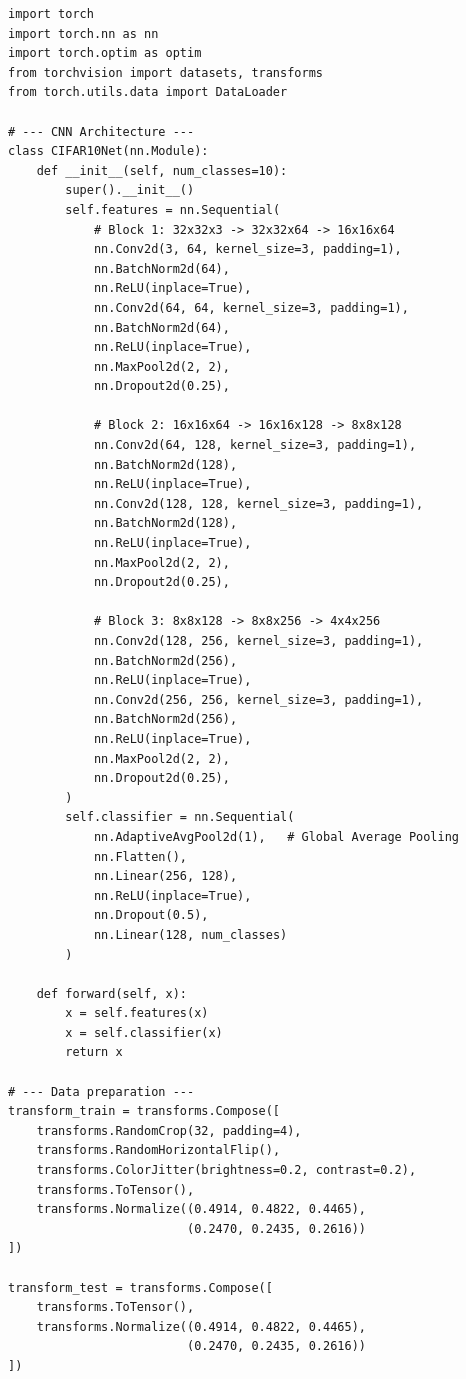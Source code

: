\begin{codeblock}[title=\textbf{CNN for CIFAR-10 with full training}]
\begin{verbatim}
import torch
import torch.nn as nn
import torch.optim as optim
from torchvision import datasets, transforms
from torch.utils.data import DataLoader

# --- CNN Architecture ---
class CIFAR10Net(nn.Module):
    def __init__(self, num_classes=10):
        super().__init__()
        self.features = nn.Sequential(
            # Block 1: 32x32x3 -> 32x32x64 -> 16x16x64
            nn.Conv2d(3, 64, kernel_size=3, padding=1),
            nn.BatchNorm2d(64),
            nn.ReLU(inplace=True),
            nn.Conv2d(64, 64, kernel_size=3, padding=1),
            nn.BatchNorm2d(64),
            nn.ReLU(inplace=True),
            nn.MaxPool2d(2, 2),
            nn.Dropout2d(0.25),

            # Block 2: 16x16x64 -> 16x16x128 -> 8x8x128
            nn.Conv2d(64, 128, kernel_size=3, padding=1),
            nn.BatchNorm2d(128),
            nn.ReLU(inplace=True),
            nn.Conv2d(128, 128, kernel_size=3, padding=1),
            nn.BatchNorm2d(128),
            nn.ReLU(inplace=True),
            nn.MaxPool2d(2, 2),
            nn.Dropout2d(0.25),

            # Block 3: 8x8x128 -> 8x8x256 -> 4x4x256
            nn.Conv2d(128, 256, kernel_size=3, padding=1),
            nn.BatchNorm2d(256),
            nn.ReLU(inplace=True),
            nn.Conv2d(256, 256, kernel_size=3, padding=1),
            nn.BatchNorm2d(256),
            nn.ReLU(inplace=True),
            nn.MaxPool2d(2, 2),
            nn.Dropout2d(0.25),
        )
        self.classifier = nn.Sequential(
            nn.AdaptiveAvgPool2d(1),   # Global Average Pooling
            nn.Flatten(),
            nn.Linear(256, 128),
            nn.ReLU(inplace=True),
            nn.Dropout(0.5),
            nn.Linear(128, num_classes)
        )

    def forward(self, x):
        x = self.features(x)
        x = self.classifier(x)
        return x

# --- Data preparation ---
transform_train = transforms.Compose([
    transforms.RandomCrop(32, padding=4),
    transforms.RandomHorizontalFlip(),
    transforms.ColorJitter(brightness=0.2, contrast=0.2),
    transforms.ToTensor(),
    transforms.Normalize((0.4914, 0.4822, 0.4465),
                         (0.2470, 0.2435, 0.2616))
])

transform_test = transforms.Compose([
    transforms.ToTensor(),
    transforms.Normalize((0.4914, 0.4822, 0.4465),
                         (0.2470, 0.2435, 0.2616))
])


\end{verbatim}
\end{codeblock}
